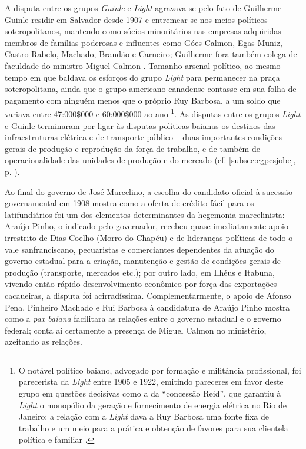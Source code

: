 A disputa entre os grupos \textit{Guinle} e \textit{Light} agravava-se pelo fato de Guilherme Guinle residir em Salvador desde 1907 e entremear-se nos meios políticos soteropolitanos, mantendo como sócios minoritários nas empresas adquiridas membros de famílias poderosas e influentes como Góes Calmon, Egas Muniz, Castro Rabelo, Machado, Brandão e Carneiro; Guilherme fora também colega de faculdade do ministro Miguel Calmon \cite[p.~50]{CUNHA2011}. Tamanho arsenal político, ao mesmo tempo em que baldava os esforços do grupo \textit{Light} para permanecer na praça soteropolitana, ainda que o grupo americano-canadense contasse em sua folha de pagamento com ninguém menos que o próprio Ruy Barbosa, a um soldo que variava entre 47:000\$000 e 60:000\$000 ao ano \cite[pp.~56-58]{CUNHA2011}\footnote{O notável político baiano, advogado por formação e militância profissional, foi parecerista da \textit{Light} entre 1905 e 1922, emitindo pareceres em favor deste grupo em questões decisivas como a da ``concessão Reid'', que garantiu à \textit{Light} o monopólio da geração e fornecimento de energia elétrica no Rio de Janeiro; a relação com a \textit{Light} dava a Ruy Barbosa uma fonte fixa de trabalho e um meio para a prática e obtenção de favores para sua clientela política e familiar \cite[pp.~56-57]{CUNHA2011}.}. As disputas entre os grupos \textit{Light} e Guinle terminaram por ligar às disputas políticas baianas os destinos das infraestruturas elétrica e de transporte público -- duas importantes condições gerais de produção e reprodução da força de trabalho, e de também de operacionalidade das unidades de produção e do mercado (cf. \autoref{subsec:cgpcsjobe}, p. \pageref{subsec:cgpcsjobe}).

Ao final do governo de José Marcelino, a escolha do candidato oficial à sucessão governamental em 1908 mostra como a oferta de crédito fácil para os latifundiários foi um dos elementos determinantes da hegemonia marcelinista: Araújo Pinho, o indicado pelo governador, recebeu quase imediatamente apoio irrestrito de Dias Coelho (Morro do Chapéu) e de lideranças políticas de todo o vale sanfranciscano, pecuaristas e comerciantes dependentes da atuação do governo estadual para a criação, manutenção e gestão de condições gerais de produção (transporte, mercados etc.); por outro lado, em Ilhéus e Itabuna, vivendo então rápido desenvolvimento econômico por força das exportações cacaueiras, a disputa foi acirradíssima. Complementarmente, o apoio de Afonso Pena, Pinheiro Machado e Rui Barbosa à candidatura de Araújo Pinho mostra como a \textit{pax baiana} facilitara as relações entre o governo estadual e o governo federal; conta aí certamente a presença de Miguel Calmon no ministério, azeitando as relações. 

